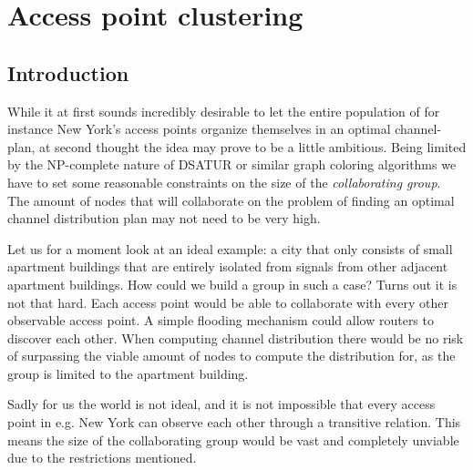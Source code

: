 \chapter{Access point clustering} \label{chap:clustering}



\section{Introduction}
While it at first sounds incredibly desirable to let the entire population of for instance New York's access points organize themselves in an optimal channel-plan,
at second thought the idea may prove to be a little ambitious. Being limited by the NP-complete nature of DSATUR or similar graph coloring algorithms
we have to set some reasonable constraints on the size of the \textit{collaborating group}. The amount of nodes that will collaborate on the problem of finding an optimal channel distribution
plan may not need to be very high.

Let us for a moment look at an ideal example: a city that only consists of small apartment buildings that are entirely isolated from signals from other adjacent apartment buildings.
How could we build a group in such a case? Turns out it is not that hard. Each access point would be able to collaborate with every other observable access point. A simple flooding mechanism
could allow routers to discover each other. When computing channel distribution there would be no risk of surpassing the viable amount of nodes to compute the distribution for,
as the group is limited to the apartment building.

Sadly for us the world is not ideal, and it is not impossible that every access point in e.g. New York can observe each other through a transitive relation. This means the size of
the collaborating group would be vast and completely unviable due to the restrictions mentioned. 

